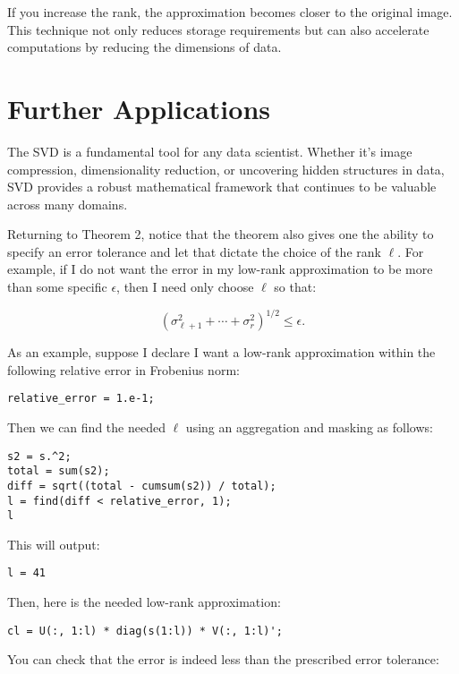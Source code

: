 \documentclass{ximera}
\begin{document}
\begin{problem}
If you increase the rank, the approximation becomes closer to the original image. This technique not only reduces storage requirements but can also accelerate computations by reducing the dimensions of data.

\section{Further Applications}

The SVD is a fundamental tool for any data scientist. Whether it’s image compression, dimensionality reduction, or uncovering hidden structures in data, SVD provides a robust mathematical framework that continues to be valuable across many domains.

Returning to Theorem 2, notice that the theorem also gives one the ability to specify an error tolerance and let that dictate the choice of the rank \( \ell \). For example, if I do not want the error in my low-rank approximation to be more than some specific \( \epsilon \), then I need only choose \( \ell \) so that:

\[
\left( \sigma_{\ell+1}^2 + \cdots + \sigma_{r}^2 \right)^{1/2} \leq \epsilon.
\]

As an example, suppose I declare I want a low-rank approximation within the following relative error in Frobenius norm:

\begin{verbatim}
relative_error = 1.e-1;
\end{verbatim}

Then we can find the needed \( \ell \) using an aggregation and masking as follows:

\begin{verbatim}
s2 = s.^2;
total = sum(s2);
diff = sqrt((total - cumsum(s2)) / total);
l = find(diff < relative_error, 1);
l
\end{verbatim}

This will output:

\begin{verbatim}
l = 41
\end{verbatim}

Then, here is the needed low-rank approximation:

\begin{verbatim}
cl = U(:, 1:l) * diag(s(1:l)) * V(:, 1:l)';
\end{verbatim}

You can check that the error is indeed less than the prescribed error tolerance:


\end{problem}
\end{document}

